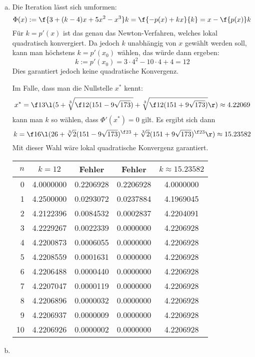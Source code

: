 \documentclass{mywork}
\begin{document}
\begin{aufgabe}~

	\begin{enumerate}[a)]
		\item
			Die Iteration lässt sich umformen:
			\[
				\Phi(x) := \f {3 + (k-4)x + 5x^2 - x^3}k = \f {-p(x) + kx}{k} = x - \f {p(x)}k
			\]
			Für $k = p'(x)$ ist das genau das Newton-Verfahren, welches lokal quadratisch konvergiert.
			Da jedoch $k$ unabhängig von $x$ gewählt werden soll, kann man höchstens $k = p'(x_0)$ wählen, das würde dann ergeben:
			\[
				k := p'(x_0) = 3\cdot 4^2 - 10\cdot 4 + 4 = 12
			\]
			Dies garantiert jedoch keine quadratische Konvergenz.

			Im Falle, dass man die Nullstelle $x^*$ kennt:
			\[
				x^* = \f 13 \l( 5 + \sqrt[3]{\f 12 (151 - 9 \sqrt {173})} + \sqrt[3]{\f 12 (151 + 9\sqrt{173})} \r) \approx 4.22069
			\]
			kann man $k$ so wählen, dass $\Phi'(x^*) = 0$ gilt.
			Es ergibt sich dann
			\[
				k = \f 16 \l( 26 + \sqrt[3]{2}(151 - 9\sqrt{173})^{\f 23} + \sqrt[3]{2} (151 + 9\sqrt{173})^{\f 23} \r) \approx 15.23582
			\]
			Mit dieser Wahl wäre lokal quadratische Konvergenz garantiert.
			\begin{table}[h]
				\centering
				\begin{tabular}{r|cc|cc}
					$n$ & $k=12$ & Fehler & Fehler & $k\approx 15.23582$ \\\hline
0 & 4.0000000 & 0.2206928 & 0.2206928 & 4.0000000\\
1 & 4.2500000 & 0.0293072 & 0.0237884 & 4.1969045\\
2 & 4.2122396 & 0.0084532 & 0.0002837 & 4.2204091\\
3 & 4.2229267 & 0.0022339 & 0.0000000 & 4.2206928\\
4 & 4.2200873 & 0.0006055 & 0.0000000 & 4.2206928\\
5 & 4.2208559 & 0.0001631 & 0.0000000 & 4.2206928\\
6 & 4.2206488 & 0.0000440 & 0.0000000 & 4.2206928\\
7 & 4.2207047 & 0.0000119 & 0.0000000 & 4.2206928\\
8 & 4.2206896 & 0.0000032 & 0.0000000 & 4.2206928\\
9 & 4.2206937 & 0.0000009 & 0.0000000 & 4.2206928\\
10 & 4.2206926 & 0.0000002 & 0.0000000 & 4.2206928\\
				\end{tabular}				
			\end{table}
		\item

\end{enumerate}
\end{aufgabe}
\end{document}
